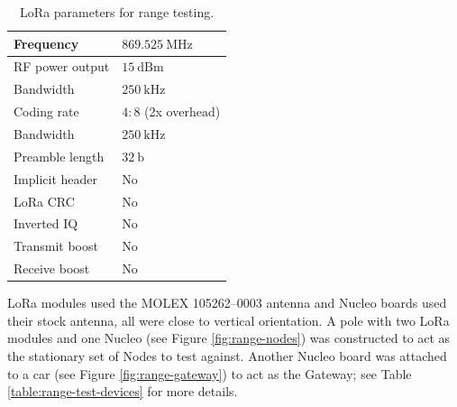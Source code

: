 \begin{table}[H]
\begin{center}
\caption{\label{table:range-test-parameters}LoRa parameters for range testing.}
    \begin{tabular}{|l|l|} \hline
    Frequency             & $869.525~\mathrm{MHz}$\\ \hline
    RF power output       & $15~\mathrm{dBm}$\\ \hline
    Bandwidth             & $250~\mathrm{kHz}$\\ \hline
    Coding rate           & $4:8$ (2x overhead) \\ \hline
    Bandwidth             & $250~\mathrm{kHz}$\\ \hline
    Preamble length       & $32~\mathrm{b}$\\ \hline
    Implicit header       & No\\ \hline
    LoRa CRC              & No\\ \hline
    Inverted IQ           & No\\ \hline
    Transmit boost        & No\\ \hline
    Receive boost         & No\\ \hline
    \end{tabular}
\end{center}
\end{table}

LoRa modules used the MOLEX 105262--0003 antenna and Nucleo boards used their stock antenna, all were close to vertical orientation. A pole with two LoRa modules and one Nucleo (see Figure \ref{fig:range-nodes}) was constructed to act as the stationary set of Nodes to test against. Another Nucleo board was attached to a car (see Figure \ref{fig:range-gateway}) to act as the Gateway; see Table \ref{table:range-test-devices} for more details.


